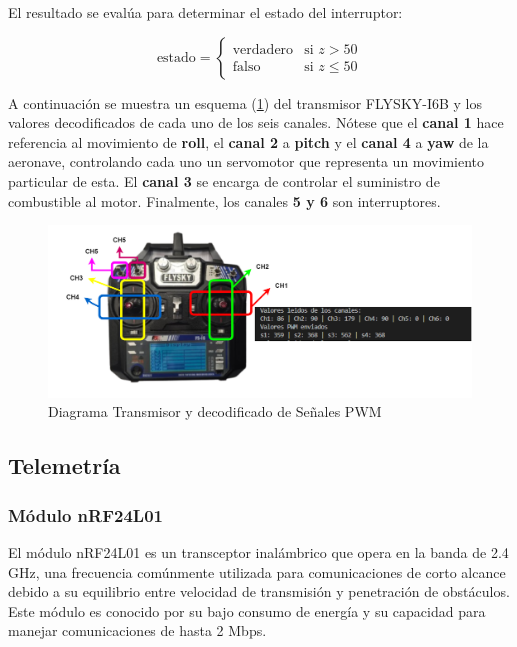             El resultado se evalúa para determinar el estado del interruptor:

            \begin{equation}
            \text{estado} = 
            \begin{cases} 
            \text{verdadero} & \text{si } z > 50 \\
            \text{falso} & \text{si } z \leq 50 
            \end{cases}
            \end{equation}

            A continuación se muestra un esquema (\ref{fig:decodificador_transmisor}) del transmisor FLYSKY-I6B y los valores decodificados de cada uno de los seis canales. Nótese que el \textbf{canal 1} hace referencia al movimiento de \textbf{roll}, el \textbf{canal 2} a \textbf{pitch} y el \textbf{canal 4} a \textbf{yaw} de la aeronave, controlando cada uno un servomotor que representa un movimiento particular de esta. El \textbf{canal 3} se encarga de controlar el suministro de combustible al motor. Finalmente, los canales \textbf{5 y 6} son interruptores.


            \begin{figure}[H]
                \centering
                \includegraphics[width=6 in]{Imagenes/Metodologia/Diagrama Receptor.png}
                \caption{Diagrama Transmisor y decodificado de Señales PWM}
                \label{fig:decodificador_transmisor}
            \end{figure}

    

\subsection{Telemetría}

    \subsubsection{Módulo nRF24L01}
        El módulo nRF24L01 es un transceptor inalámbrico que opera en la banda de 2.4 GHz, una frecuencia comúnmente utilizada para comunicaciones de corto alcance debido a su equilibrio entre velocidad de transmisión y penetración de obstáculos. Este módulo es conocido por su bajo consumo de energía y su capacidad para manejar comunicaciones de hasta 2 Mbps.\\ 

